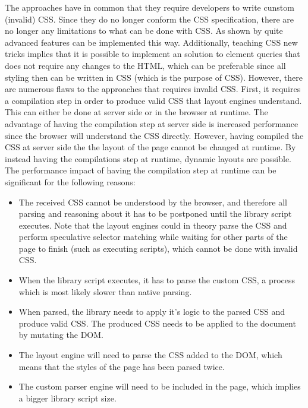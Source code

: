 \documentclass[a4paper,11pt]{kth-mag}
\begin{document}
    The approaches \cite{eq_imp_magichtml,eq_imp_eqcss,eq_imp_prollyfill-min-width,eq_imp_localised-css,eq_imp_gss} have in common that they require developers to write cunstom (invalid) \gls{CSS}.
    Since they do no longer conform the \gls{CSS} specification, there are no longer any limitations to what can be done with \gls{CSS}.
    As shown by \cite{eq_imp_eqcss,eq_imp_gss} quite advanced features can be implemented this way.
    Additionally, teaching \gls{CSS} new tricks implies that it is possible to implement an solution to element queries that does not require any changes to the \gls{HTML}, which can be preferable since all styling then can be written in \gls{CSS} (which is the purpose of \gls{CSS}).
    However, there are numerous flaws to the approaches that requires invalid \gls{CSS}.
    First, it requires a compilation step in order to produce valid \gls{CSS} that layout engines understand.
    This can either be done at server side or in the browser at runtime.
    The advantage of having the compilation step at server side is increased performance since the browser will understand the \gls{CSS} directly.
    However, having compiled the \gls{CSS} at server side the the layout of the page cannot be changed at runtime.
    By instead having the compilations step at runtime, dynamic layouts are possible.
    The performance impact of having the compilation step at runtime can be significant for the following reasons:
    \begin{itemize}
      \item The received \gls{CSS} cannot be understood by the browser, and therefore all parsing and reasoning about it has to be postponed until the library script executes.
      Note that the layout engines could in theory parse the \gls{CSS} and perform speculative selector matching while waiting for other parts of the page to finish (such as executing scripts), which cannot be done with invalid \gls{CSS}.
      \item When the library script executes, it has to parse the custom \gls{CSS}, a process which is most likely slower than native parsing.
      \item When parsed, the library needs to apply it's logic to the parsed \gls{CSS} and produce valid \gls{CSS}. The produced \gls{CSS} needs to be applied to the document by mutating the \gls{DOM}.
      \item The layout engine will need to parse the \gls{CSS} added to the \gls{DOM}, which means that the styles of the page has been parsed twice.
      \item The custom parser engine will need to be included in the page, which implies a bigger library script size.
    \end{itemize}
\end{document}
